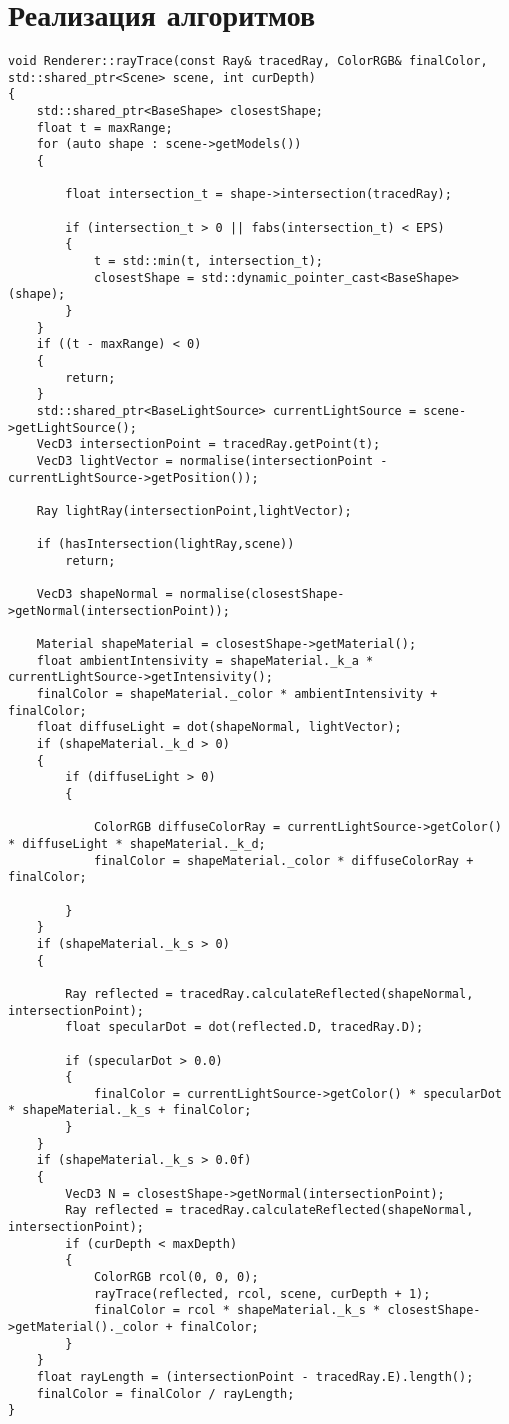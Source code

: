 \section{Реализация алгоритмов}
\begin{lstlisting}[label = lst:raytrace,caption= {Алгоритм обратной трассировки луча}]
    void Renderer::rayTrace(const Ray& tracedRay, ColorRGB& finalColor, std::shared_ptr<Scene> scene, int curDepth)
{
	std::shared_ptr<BaseShape> closestShape;
	float t = maxRange;
	for (auto shape : scene->getModels())
	{

		float intersection_t = shape->intersection(tracedRay);
		
		if (intersection_t > 0 || fabs(intersection_t) < EPS)
		{
			t = std::min(t, intersection_t);
			closestShape = std::dynamic_pointer_cast<BaseShape>(shape);
		}
	}
	if ((t - maxRange) < 0)
	{
        return;
    }
	std::shared_ptr<BaseLightSource> currentLightSource = scene->getLightSource();
	VecD3 intersectionPoint = tracedRay.getPoint(t);
	VecD3 lightVector = normalise(intersectionPoint - currentLightSource->getPosition());

	Ray lightRay(intersectionPoint,lightVector);
    
	if (hasIntersection(lightRay,scene))
		return;

	VecD3 shapeNormal = normalise(closestShape->getNormal(intersectionPoint));

	Material shapeMaterial = closestShape->getMaterial();
	float ambientIntensivity = shapeMaterial._k_a * currentLightSource->getIntensivity();
	finalColor = shapeMaterial._color * ambientIntensivity + finalColor;
	float diffuseLight = dot(shapeNormal, lightVector);
	if (shapeMaterial._k_d > 0)
	{
		if (diffuseLight > 0)
		{
			
			ColorRGB diffuseColorRay = currentLightSource->getColor() * diffuseLight * shapeMaterial._k_d;
			finalColor = shapeMaterial._color * diffuseColorRay + finalColor;

		}
	}
	if (shapeMaterial._k_s > 0)
	{

		Ray reflected = tracedRay.calculateReflected(shapeNormal, intersectionPoint);
		float specularDot = dot(reflected.D, tracedRay.D);
	
		if (specularDot > 0.0)
		{
			finalColor = currentLightSource->getColor() * specularDot * shapeMaterial._k_s + finalColor;
		}
	}
	if (shapeMaterial._k_s > 0.0f)
	{
		VecD3 N = closestShape->getNormal(intersectionPoint);
		Ray reflected = tracedRay.calculateReflected(shapeNormal, intersectionPoint);
		if (curDepth < maxDepth)
		{
			ColorRGB rcol(0, 0, 0);
			rayTrace(reflected, rcol, scene, curDepth + 1);
			finalColor = rcol * shapeMaterial._k_s * closestShape->getMaterial()._color + finalColor;
		}
	}
	float rayLength = (intersectionPoint - tracedRay.E).length();
	finalColor = finalColor / rayLength;
}
\end{lstlisting}

